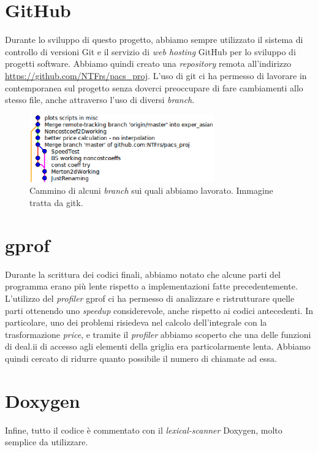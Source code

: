 \documentclass[a4paper,10pt]{report}
\theoremstyle{plain}
\theoremstyle{definition}
\theoremstyle{remark}
\begin{document}
\section{GitHub}
Durante lo sviluppo di questo progetto, abbiamo sempre utilizzato il sistema di controllo di versioni Git e il servizio di \emph{web hosting} GitHub per lo sviluppo di progetti software. Abbiamo quindi creato una \emph{repository} remota all'indirizzo \url{https://github.com/NTFrs/pacs_proj}. L'uso di git ci ha permesso di lavorare in contemporanea sul progetto senza doverci preoccupare di fare cambiamenti allo stesso file, anche attraverso l'uso di diversi \emph{branch}.
\begin{figure}[!h]
 \begin{center}
 \includegraphics[width=8cm]{img/Git.eps}
 \caption{Cammino di alcuni \emph{branch} sui quali abbiamo lavorato. Immagine tratta da \textsf{gitk}.}
 \label{fig:gitk}
 \end{center}
\end{figure}

\section{\textsf{gprof}}
Durante la scrittura dei codici finali, abbiamo notato che alcune parti del programma erano più lente rispetto a implementazioni fatte precedentemente. L'utilizzo del \emph{profiler} \textsf{gprof} ci ha permesso di analizzare e ristrutturare quelle parti ottenendo uno \emph{speedup} considerevole, anche rispetto ai codici antecedenti. In particolare, uno dei problemi risiedeva nel calcolo dell'integrale con la trasformazione \emph{price}, e tramite il \emph{profiler} abbiamo scoperto che una delle funzioni di \textsf{deal.ii} di accesso agli elementi della griglia era particolarmente lenta. Abbiamo quindi cercato di ridurre quanto possibile il numero di chiamate ad essa.
\section{\textsf{Doxygen}}
Infine, tutto il codice \`e commentato con il \emph{lexical-scanner} \textsf{Doxygen}, molto semplice da utilizzare. 
\end{document}
